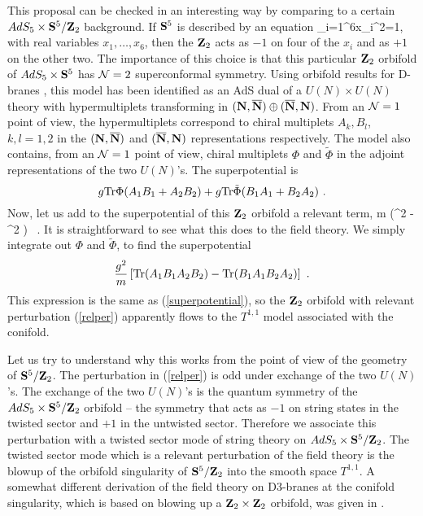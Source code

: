 \documentclass[12pt]{article}
\begin{document}
This proposal can be checked in an interesting
way by comparing to a certain
$AdS_5\times {\bf S}^5/{\bf Z}_2$ background.  If ${\bf S}^5$ is described
by an equation
\be\label{beqnop}
\sum_{i=1}^6x_i^2=1,
\ee
with real variables $x_1,\dots, x_6$,
then the ${\bf Z}_2$ acts as $-1$ on four of the $x_i$ and
as $+1$ on the other two.  The importance of this choice is that this
particular
 ${\bf Z}_2$ orbifold of $AdS_5\times {\bf S}^5$
  has ${\cal N}=2$ superconformal symmetry.
Using orbifold results for D-branes \cite{dm}, this model has been 
identified \cite{ks} as an AdS dual of a $U(N)\times U(N)$ theory
with hypermultiplets transforming in
$({\bf N},\overline{{\bf N}})\oplus (\overline {{\bf N}},{\bf N})$. From an ${\cal N}=1$ point of 
view, the hypermultiplets                
correspond to chiral multiplets $A_k,B_l$, $k,l=1,2$ in the 
$({\bf N},\overline {{\bf N}})$ and $(\overline {{\bf N}},{\bf N})$  representations respectively.  
The model also contains, from an ${\cal N}=1$ point of view, chiral multiplets
$\Phi$ and $\tilde \Phi$ in the adjoint representations of the two
$U(N)$'s. 
The superpotential is
$$ g {\rm Tr} \Phi (A_1 B_1 + A_2 B_2) + g {\rm Tr} \tilde \Phi (B_1 A_1 + B_2 A_2)
\ .
$$
Now, let us add to the superpotential of this ${\bf Z}_2$ orbifold
a relevant term,
\be \label{relper}{m} (\Tr \Phi^2 - \Tr \tilde \Phi^2 )
\ .
\ee
It is straightforward to see what this does to the field theory.
We simply integrate out $\Phi$ and $\tilde \Phi$,
to find the superpotential
$$ {g^2\over m} \left [{\rm Tr} (A_1 B_1 A_2 B_2) - {\rm Tr} (B_1 A_1 B_2 A_2)
\right ]\ .
$$
This expression is the same as (\ref{superpotential}), so the
${\bf Z}_2$ orbifold with relevant perturbation (\ref{relper}) 
apparently flows to the $T^{1,1}$ model associated with the conifold.

Let us try to understand why this works from the point of view of the
geometry of ${\bf S}^5/{\bf Z}_2$.  The perturbation in (\ref{relper})
is odd under exchange of the two $U(N)$'s.  The exchange of the two $U(N)$'s
is the quantum symmetry of the $AdS_5\times {\bf S}^5/{\bf Z}_2$ orbifold
-- the symmetry that acts as $-1$ on string states in the twisted sector
and $+1$ in the untwisted  sector.  Therefore we
associate this perturbation with a twisted sector mode of string
theory on $AdS_5\times {\bf S}^5/{\bf Z}_2$.  The twisted sector mode
which is a relevant perturbation of the field theory is the blowup
of the orbifold singularity of ${\bf S}^5/{\bf Z}_2$ into the smooth space 
$T^{1,1}$. A somewhat different derivation of the field theory
on D3-branes at the conifold singularity, which is based on blowing
up a ${\bf Z}_2\times {\bf Z}_2$ orbifold, was given in \cite{MP}.
\end{document}
